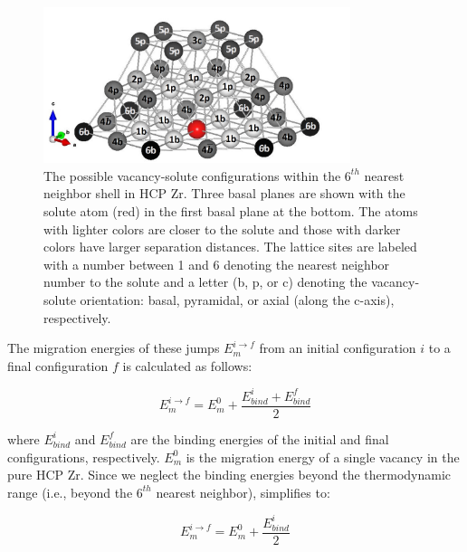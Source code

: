 \documentclass[preprint,12pt]{elsarticle}
\begin{document}
\begin{figure}[h!]
    \centering \includegraphics[width=0.8\textwidth]{configurations_labelled.jpg}
    \caption{The possible vacancy-solute configurations within the $6^{th}$ nearest neighbor shell in HCP Zr. Three basal planes are shown with the solute atom (red) in the first basal plane at the bottom. The atoms with lighter colors are closer to the solute and those with darker colors have larger separation distances. The lattice sites are labeled with a number between 1 and 6 denoting the nearest neighbor number to the solute and a letter (b, p, or c) denoting the vacancy-solute orientation: basal, pyramidal, or axial (along the c-axis), respectively.}
    \label{fig:configurations}
\end{figure}

The migration energies of these jumps $ E_m^{i\rightarrow f}$ from an initial configuration $i$ to a final configuration $f$ is calculated as follows:

\begin{equation}
\label{eq_KRA}
    E_m^{i\rightarrow f} = E_m^0 + \frac{E_{bind}^i + E_{bind}^f}{2}
\end{equation}

\noindent where $E_{bind}^i$ and $E_{bind}^f$ are the binding energies of the initial and final configurations, respectively. $E_m^0$ is the migration energy of a single vacancy in the pure HCP Zr. Since we neglect the binding energies beyond the thermodynamic range (i.e., beyond the $6^{th}$ nearest neighbor),  simplifies to:

\begin{equation}
      E_m^{i\rightarrow f} = E_m^0 + \frac{E_{bind}^i}{2}  
\end{equation}
\end{document}
